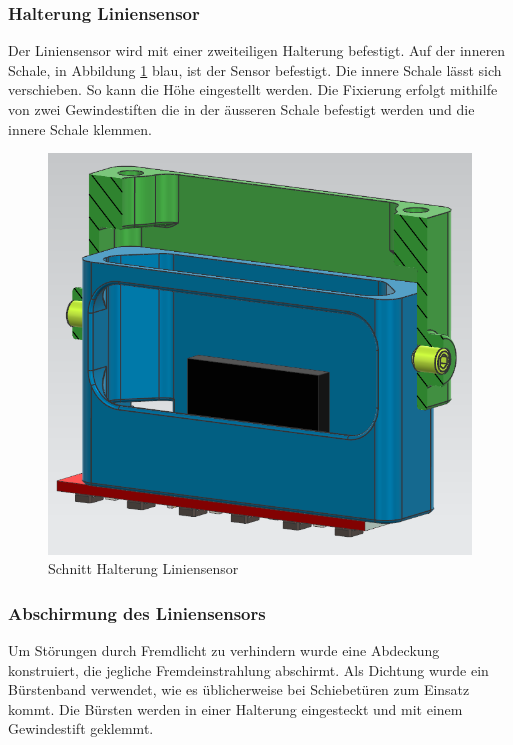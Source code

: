 \subsubsection{Halterung Liniensensor}
\label{Halterung Liniensensor}

Der Liniensensor wird mit einer zweiteiligen Halterung befestigt. Auf der inneren Schale, in Abbildung \ref{fig:Schnitt Halterung Liniensensor} blau, ist der Sensor befestigt. Die innere Schale lässt sich verschieben. So kann die Höhe eingestellt werden. Die Fixierung erfolgt mithilfe von zwei Gewindestiften die in der äusseren Schale befestigt werden und die innere Schale klemmen. 


\begin{figure}[H]
    \centering
    \includegraphics[width=0.75\linewidth]{assets//MT/Sensor Halterung.png}
    \caption{Schnitt Halterung Liniensensor}
    \label{fig:Schnitt Halterung Liniensensor}
\end{figure}


\subsubsection{Abschirmung des Liniensensors}
\label{Abschirmung des Liniensensors}

Um Störungen durch Fremdlicht zu verhindern wurde eine Abdeckung konstruiert, die jegliche Fremdeinstrahlung abschirmt. Als Dichtung wurde ein Bürstenband verwendet, wie es üblicherweise bei Schiebetüren zum Einsatz kommt. Die Bürsten werden in einer Halterung eingesteckt und mit einem Gewindestift geklemmt. 


\begin{figure}[H]
 
\end{figure}
\newpage

